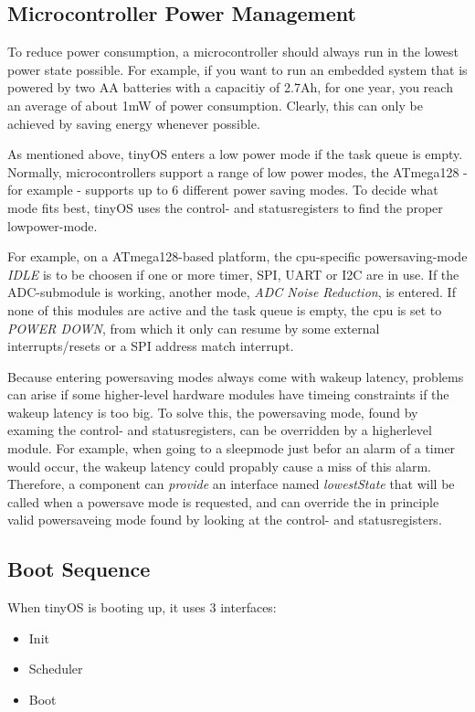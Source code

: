 \subsection{Microcontroller Power Management}

To reduce power consumption, a microcontroller should always run in the lowest power state possible. For example, if you want to run an embedded system that is powered by two AA batteries with a capacitiy of 2.7Ah, for one year, you reach an average of about 1mW of power consumption. Clearly, this can only be achieved by saving energy whenever possible.

As mentioned above, tinyOS enters a low power mode if the task queue is empty. Normally, microcontrollers support a range of low power modes, the ATmega128 - for example - supports up to 6 different power saving modes.
To decide what mode fits best, tinyOS uses the control- and statusregisters to find the proper lowpower-mode.

For example, on a ATmega128-based platform, the cpu-specific powersaving-mode \textit{IDLE} is to be choosen if one or more timer, SPI, UART or I2C are in use. If the ADC-submodule is working, another mode, \textit{ADC Noise Reduction}, is entered. If none of this modules are active and the task queue is empty, the cpu is set to \textit{POWER DOWN}, from which it only can resume by some external interrupts/resets or a SPI address match interrupt.

Because entering powersaving modes always come with wakeup latency, problems can arise if some higher-level hardware modules have timeing constraints if the wakeup latency is too big. To solve this, the powersaving mode, found by examing the control- and statusregisters, can be overridden by a higherlevel module. For example, when going to a sleepmode just befor an alarm of a timer would occur, the wakeup latency could propably cause a miss of this alarm. Therefore, a component can \textit{provide} an interface named \textit{lowestState} that will be called when a powersave mode is requested, and can override the in principle valid powersaveing mode found by looking at the control- and statusregisters.

\subsection{Boot Sequence}

When tinyOS is booting up, it uses 3 interfaces:

\begin{itemize}
 \item Init
 \item Scheduler
 \item Boot
\end{itemize}

